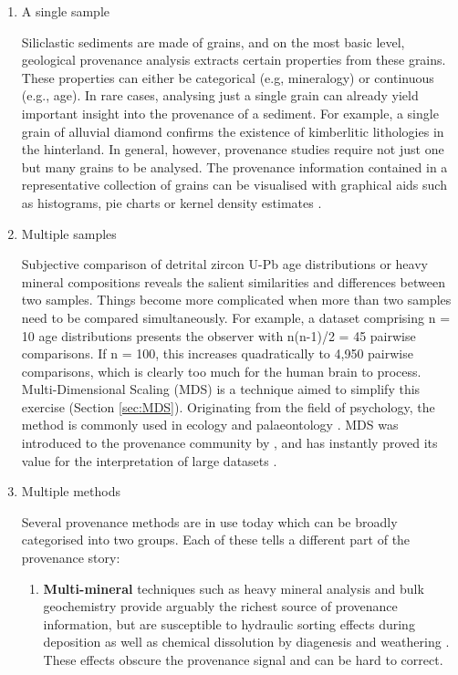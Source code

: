 \documentclass{article}
\begin{document}
\begin{enumerate}

\item{A single sample}

Siliclastic sediments are made of grains, and on the most basic level,
geological provenance analysis extracts certain properties from these
grains. These properties can either be categorical (e.g, mineralogy)
or continuous (e.g., age). In rare cases, analysing just a single
grain can already yield important insight into the provenance of a
sediment. For example, a single grain of alluvial diamond confirms the
existence of kimberlitic lithologies in the hinterland. In general,
however, provenance studies require not just one but many grains to be
analysed. The provenance information contained in a representative
collection of grains can be visualised with graphical aids such as
histograms, pie charts or kernel density estimates
\citep{vermeesch2012b}.

\item{Multiple samples}

Subjective comparison of detrital zircon U-Pb age distributions or
heavy mineral compositions reveals the salient similarities and
differences between two samples. Things become more complicated when
more than two samples need to be compared simultaneously.  For
example, a dataset comprising n = 10 age distributions presents the
observer with n(n-1)/2 = 45 pairwise comparisons. If n = 100, this
increases quadratically to 4,950 pairwise comparisons, which is
clearly too much for the human brain to process. Multi-Dimensional
Scaling (MDS) is a technique aimed to simplify this exercise (Section
\ref{sec:MDS}). Originating from the field of psychology, the method
is commonly used in ecology \citep{kenkel1986} and palaeontology
\citep[e.g.,][]{dunkley2008, schneider2011}. MDS was introduced to the
provenance community by \citet{vermeesch2013}, and has instantly
proved its value for the interpretation of large datasets
\citep[e.g.,][]{stevens2013, nie2014}.

\item{Multiple methods}

Several provenance methods are in use today which can be broadly
categorised into two groups. Each of these tells a different part of
the provenance story:

\begin{enumerate}
\item{\bf Multi-mineral} techniques such as heavy mineral analysis and
  bulk geochemistry provide arguably the richest source of provenance
  information, but are susceptible to hydraulic sorting effects during
  deposition as well as chemical dissolution by diagenesis and
  weathering \citep{garzanti2009, ando2012}.  These effects obscure
  the provenance signal and can be hard to correct.


\end{enumerate}
\end{enumerate}
\end{document}
